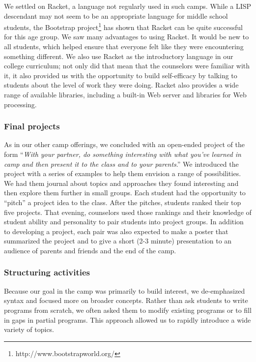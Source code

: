 We settled on Racket, a language not regularly used in such camps.  While a
LISP descendant may not seem to be an appropriate language for
middle school students, the Bootstrap
project\footnote{http://www.bootstrapworld.org/} \cite{Bootstrap-McClanahan,Bootstrap-SPLASH2013,Bootstrap-SIGCSE2018} has shown that
Racket can be quite successful for this age group.
We saw many advantages to using Racket.  It would be new to
all students, which helped ensure that everyone felt like they
were encountering something different.  We also use Racket as the
introductory language in our college curriculum; not only did that
mean that the counselors were familiar with it, it also provided
us with the opportunity to build self-efficacy by talking to students
about the level of work they were doing.  Racket also provides a
wide range of available libraries, including a built-in Web server
and libraries for Web processing.  

\subsubsection{Final projects}

As in our other camp offerings, we concluded with an open-ended
project of the form ``\textit{With your partner, do something interesting
with what you've learned in camp and then present it to the class
and to your parents}.'' We introduced the project with a series of
examples to help them envision a range of possibilities.  We
had them journal about topics and approaches they found interesting
and then explore them further in small groups.  Each student 
had the opportunity to ``pitch'' a project idea to the class.  After
the pitches, students ranked their top five projects.  That evening,
counselors used those rankings and their knowledge of student ability
and personality to pair students into project groups.
In addition to developing a project, each pair was also expected to make
a poster that summarized the project and to give a short (2-3 minute)
presentation to an audience of parents and friends and the end of the
camp.

\subsubsection{Structuring activities}

Because our goal in the camp was primarily to build interest, we
de-emphasized syntax and focused more on broader concepts.  Rather
than ask students to write programs from scratch, we often asked
them to modify existing programs or to fill in gaps in partial
programs.  This approach allowed us to rapidly introduce a wide
variety of topics.

